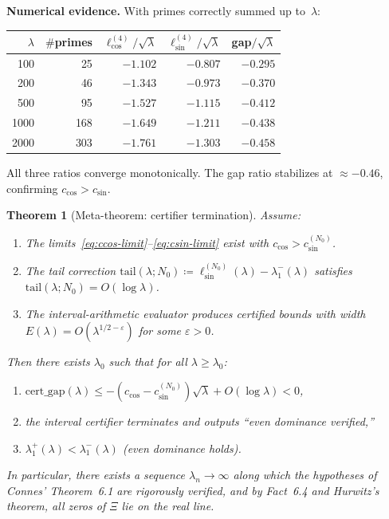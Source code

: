 \documentclass[12pt,a4paper]{article}
\newtheorem{theorem}{Theorem}[section]
\theoremstyle{definition}
\theoremstyle{remark}
\begin{document}
\noindent\textbf{Numerical evidence.} With primes correctly summed up to~$\lambda$:

\begin{center}
\renewcommand{\arraystretch}{1.15}
\begin{tabular}{r|r|r|r|r}
$\lambda$ & $\#$primes & $\ell_{\cos}^{(4)}/\sqrt{\lambda}$ & $\ell_{\sin}^{(4)}/\sqrt{\lambda}$ & gap$/\sqrt{\lambda}$ \\\hline
100  & 25  & $-1.102$ & $-0.807$ & $-0.295$ \\
200  & 46  & $-1.343$ & $-0.973$ & $-0.370$ \\
500  & 95  & $-1.527$ & $-1.115$ & $-0.412$ \\
1000 & 168 & $-1.649$ & $-1.211$ & $-0.438$ \\
2000 & 303 & $-1.761$ & $-1.303$ & $-0.458$
\end{tabular}
\end{center}

\noindent All three ratios converge monotonically. The gap ratio stabilizes at $\approx -0.46$, confirming $c_{\cos} > c_{\sin}$.

\begin{theorem}[Meta-theorem: certifier termination]
\label{thm:meta}
Assume:
\begin{enumerate}[label=\textup{(M\arabic*)}]
  \item\label{M1} The limits~\eqref{eq:ccos-limit}--\eqref{eq:csin-limit} exist with $c_{\cos} > c_{\sin}^{(N_0)}$.
  \item\label{M2} The tail correction $\mathrm{tail}(\lambda; N_0) \coloneqq \ell_{\sin}^{(N_0)}(\lambda) - \lambda_1^-(\lambda)$ satisfies $\mathrm{tail}(\lambda; N_0) = O(\log\lambda)$.
  \item\label{M3} The interval-arithmetic evaluator produces certified bounds with width $E(\lambda) = O(\lambda^{1/2-\varepsilon})$ for some $\varepsilon > 0$.
\end{enumerate}
Then there exists $\lambda_0$ such that for all $\lambda \geq \lambda_0$:
\begin{enumerate}[label=\textup{(\roman*)}]
  \item $\mathrm{cert\_gap}(\lambda) \leq -(c_{\cos} - c_{\sin}^{(N_0)})\sqrt{\lambda} + O(\log\lambda) < 0$,
  \item the interval certifier terminates and outputs ``even dominance verified,''
  \item $\lambda_1^+(\lambda) < \lambda_1^-(\lambda)$ (even dominance holds).
\end{enumerate}
In particular, there exists a sequence $\lambda_n \to \infty$ along which the hypotheses of Connes' Theorem~6.1 are rigorously verified, and by Fact~6.4 and Hurwitz's theorem, all zeros of $\Xi$ lie on the real line.
\end{theorem}
\end{document}
